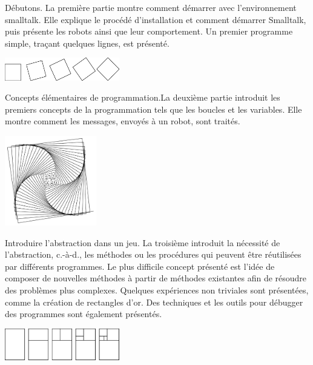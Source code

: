 \documentclass[a4paper,10pt,twoside]{book}
\begin{document}
\begin{description}
	\item D\'ebutons. La premi\`ere partie montre comment d\'emarrer avec l'environnement smalltalk. Elle explique le proc\'ed\'e d'installation et comment d\'emarrer Smalltalk, puis pr\'esente les robots ainsi que leur comportement. Un premier programme simple, tra\c cant quelques lignes, est pr\'esent\'e. 
	\begin{center}
	\includegraphics[width=5cm]{1-ChTurntitlePicture}
	\end{center}
	
	\item Concepts \'el\'ementaires de programmation.La deuxi\`eme partie introduit les premiers concepts de la programmation tels que les boucles et les variables. Elle montre comment les messages, envoy\'es \`a un robot, sont trait\'es.
	
	\begin{center}
	\includegraphics[width=4cm]{2-varLoopsTitle}
	\end{center}
	
	\item Introduire l'abstraction dans un jeu. La troisi\`eme introduit la n\'ecessit\'e de l'abstraction, c.-\`a-d., les m\'ethodes ou les proc\'edures qui peuvent \^etre r\'eutilis\'ees par diff\'erents programmes. Le plus difficile concept pr\'esent\'e est l'id\'ee de composer de nouvelles m\'ethodes \`a partir de m\'ethodes existantes afin de r\'esoudre des probl\`emes plus complexes. Quelques exp\'eriences non triviales sont pr\'esent\'ees, comme la cr\'eation de rectangles d'or. Des techniques et les outils pour d\'ebugger des programmes sont \'egalement pr\'esent\'es.
	
	
	\begin{center}
	\includegraphics[width=5cm]{3-nborsteps}
	\end{center}
	

\end{description}
\end{document}
